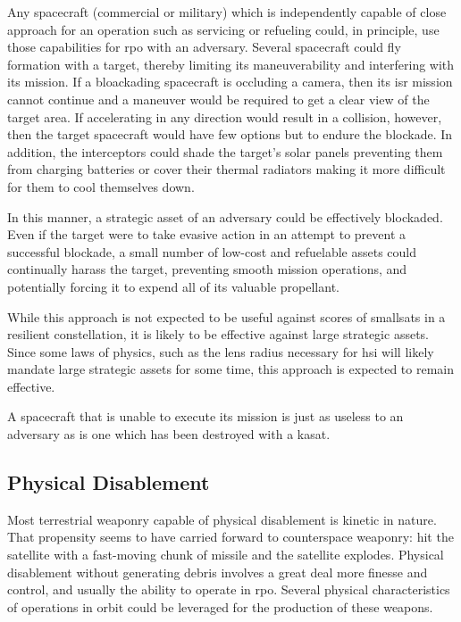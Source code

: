 Any spacecraft (commercial or military) which is independently capable
of close approach for an operation such as servicing or refueling
could, in principle, use those capabilities for \ac{rpo} with an
adversary.  Several spacecraft could fly formation with a target,
thereby limiting its maneuverability and interfering with its mission.
If a bloackading spacecraft is occluding a camera, then its \ac{isr}
mission cannot continue and a maneuver would be required to get a
clear view of the target area.  If accelerating in any direction would
result in a collision, however, then the target spacecraft would have
few options but to endure the blockade.  In addition, the interceptors
could shade the target's solar panels preventing them from charging
batteries or cover their thermal radiators making it more difficult
for them to cool themselves down.

In this manner, a strategic asset of an adversary could be effectively
blockaded.  Even if the target were to take evasive action in an
attempt to prevent a successful blockade, a small number of low-cost
and refuelable assets could continually harass the target, preventing
smooth mission operations, and potentially forcing it to expend all of
its valuable propellant.

While this approach is not expected to be useful against scores of
smallsats in a resilient constellation, it is likely to be effective
against large strategic assets. Since some laws of physics, such as
the lens radius necessary for \acf{hsi} will likely mandate large
strategic assets for some time, this approach is expected to remain
effective.

A spacecraft that is unable to execute its mission is just as useless
to an adversary as is one which has been destroyed with a \ac{kasat}.

\subsection{Physical Disablement}
Most terrestrial weaponry capable of physical disablement is kinetic
in nature.  That propensity seems to have carried forward to
counterspace weaponry: hit the satellite with a fast-moving chunk of
missile and the satellite explodes.  Physical disablement without
generating debris involves a great deal more finesse and control, and
usually the ability to operate in \ac{rpo}.  Several physical
characteristics of operations in orbit could be leveraged for the
production of these weapons.

